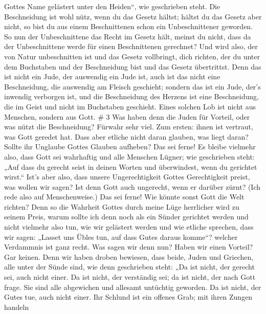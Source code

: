 Gottes Name gelästert unter den Heiden``, wie geschrieben steht.
 Die Beschneidung ist wohl nütz, wenn du das Gesetz hältst;
hältst du das Gesetz aber nicht, so bist du aus einem Beschnittenen
schon ein Unbeschnittener geworden.  So nun der
Unbeschnittene das Recht im Gesetz hält, meinst du nicht, dass da der
Unbeschnittene werde für einen Beschnittenen gerechnet? 
Und wird also, der von Natur unbeschnitten ist und das Gesetz
vollbringt, dich richten, der du unter dem Buchstaben und der
Beschneidung bist und das Gesetz übertrittst.  Denn das ist
nicht ein Jude, der auswendig ein Jude ist, auch ist das nicht eine
Beschneidung, die auswendig am Fleisch geschieht;  sondern
das ist ein Jude, der's inwendig verborgen ist, und die Beschneidung des
Herzens ist eine Beschneidung, die im Geist und nicht im Buchstaben
geschieht. Eines solchen Lob ist nicht aus Menschen, sondern aus Gott.
\# 3  Was haben denn die Juden für Vorteil, oder was nützt
die Beschneidung?  Fürwahr sehr viel. Zum ersten: ihnen ist
vertraut, was Gott geredet hat.  Dass aber etliche nicht
daran glauben, was liegt daran? Sollte ihr Unglaube Gottes Glauben
aufheben?  Das sei ferne! Es bleibe vielmehr also, dass Gott
sei wahrhaftig und alle Menschen Lügner; wie geschrieben steht: „Auf
dass du gerecht seist in deinen Worten und überwindest, wenn du
gerichtet wirst.``  Ist's aber also, dass unsere
Ungerechtigkeit Gottes Gerechtigkeit preist, was wollen wir sagen? Ist
denn Gott auch ungerecht, wenn er darüber zürnt? (Ich rede also auf
Menschenweise.)  Das sei ferne! Wie könnte sonst Gott die
Welt richten?  Denn so die Wahrheit Gottes durch meine Lüge
herrlicher wird zu seinem Preis, warum sollte ich denn noch als ein
Sünder gerichtet werden  und nicht vielmehr also tun, wie
wir gelästert werden und wie etliche sprechen, dass wir sagen: „Lasset
uns Übles tun, auf dass Gutes daraus komme``? welcher Verdammnis ist
ganz recht.  Was sagen wir denn nun? Haben wir einen
Vorteil? Gar keinen. Denn wir haben droben bewiesen, dass beide, Juden
und Griechen, alle unter der Sünde sind,  wie denn
geschrieben steht: „Da ist nicht, der gerecht sei, auch nicht einer.
 Da ist nicht, der verständig sei; da ist nicht, der nach
Gott frage.  Sie sind alle abgewichen und allesamt
untüchtig geworden. Da ist nicht, der Gutes tue, auch nicht einer.
 Ihr Schlund ist ein offenes Grab; mit ihren Zungen handeln
